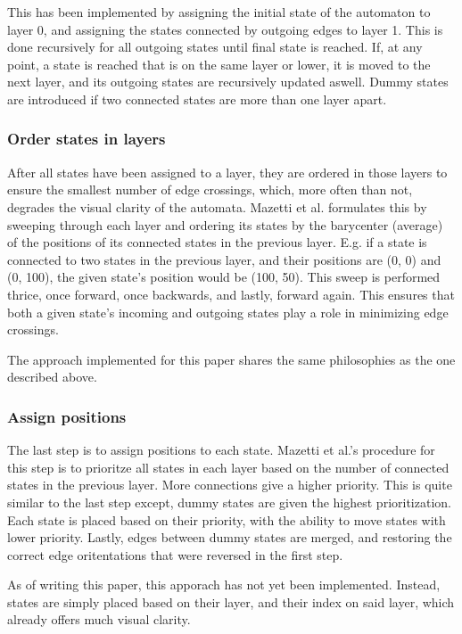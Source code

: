 This has been implemented by assigning the initial state of the automaton to layer 0, and assigning the states connected by outgoing edges to layer 1.
This is done recursively for all outgoing states until final state is reached.
If, at any point, a state is reached that is on the same layer or lower, it is moved to the next layer, and its outgoing states are recursively updated aswell.
Dummy states are introduced if two connected states are more than one layer apart.



\subsubsection{Order states in layers}
After all states have been assigned to a layer, they are ordered in those layers to ensure the smallest number of edge crossings, which, more often than not, degrades the visual clarity of the automata.
Mazetti et al. formulates this by sweeping through each layer and ordering its states by the barycenter (average) of the positions of its connected states in the previous layer.
E.g. if a state is connected to two states in the previous layer, and their positions are (0, 0) and (0, 100), the given state's position would be (100, 50).
This sweep is performed thrice, once forward, once backwards, and lastly, forward again.
This ensures that both a given state's incoming and outgoing states play a role in minimizing edge crossings. \cite{Mazetti2012}

The approach implemented for this paper shares the same philosophies as the one described above.


\subsubsection{Assign positions}
The last step is to assign positions to each state.
Mazetti et al.'s procedure for this step is to prioritze all states in each layer based on the number of connected states in the previous layer.
More connections give a higher priority. This is quite similar to the last step except, dummy states are given the highest prioritization.
Each state is placed based on their priority, with the ability to move states with lower priority.
Lastly, edges between dummy states are merged, and restoring the correct edge oritentations that were reversed in the first step. \cite{Mazetti2012}

As of writing this paper, this apporach has not yet been implemented. Instead, states are simply placed based on their layer, and their index on said layer, which already offers much visual clarity.

